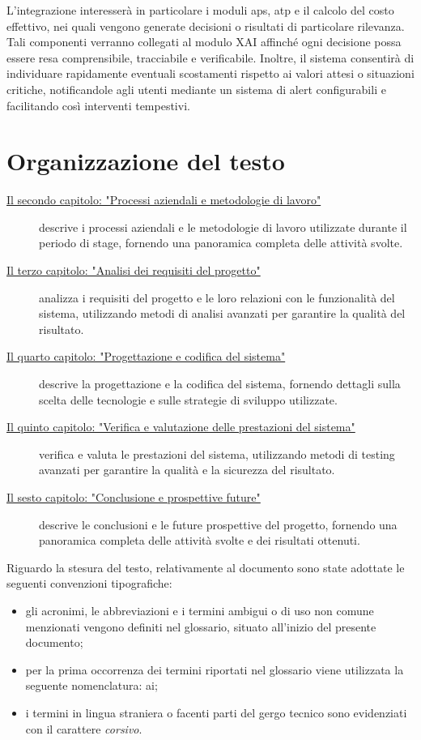 L'integrazione interesserà in particolare i moduli \acrfull{aps}, \acrfull{atp} e il calcolo del 
costo effettivo, nei quali vengono generate decisioni o risultati di particolare 
rilevanza. Tali componenti verranno collegati al modulo XAI affinché ogni decisione possa 
essere resa comprensibile, tracciabile e verificabile. Inoltre, il sistema consentirà di 
individuare rapidamente eventuali scostamenti rispetto ai valori attesi o situazioni 
critiche, notificandole agli utenti mediante un sistema di alert configurabili e facilitando 
così interventi tempestivi.





\section{Organizzazione del testo}

\begin{description}
    \item[\hyperlink{chap:processi-metodologie}{Il secondo capitolo: "Processi aziendali e metodologie di
lavoro"}] descrive i processi aziendali e le metodologie di lavoro utilizzate durante il periodo di stage,
fornendo una panoramica completa delle attività svolte.
    \item[\hyperlink{chap:analisi-requisiti}{Il terzo capitolo: "Analisi dei requisiti del progetto"}] analizza i
requisiti del progetto e le loro relazioni con le funzionalità del sistema, utilizzando metodi di analisi avanzati
per garantire la qualità del risultato.
    \item[\hyperlink{chap:progettazione-codifica}{Il quarto capitolo: "Progettazione e codifica del sistema"}]
descrive la progettazione e la codifica del sistema, fornendo dettagli sulla scelta delle tecnologie e sulle
strategie di sviluppo utilizzate.
    \item[\hyperlink{chap:verifica-validazione}{Il quinto capitolo: "Verifica e valutazione delle prestazioni del
sistema"}] verifica e valuta le prestazioni del sistema, utilizzando metodi di testing avanzati per garantire la
qualità e la sicurezza del risultato.
    \item[\hyperlink{chap:conclusioni}{Il sesto capitolo: "Conclusione e prospettive future"}] descrive le
conclusioni e le future prospettive del progetto, fornendo una panoramica completa delle attività svolte e dei
risultati ottenuti.
\end{description}

Riguardo la stesura del testo, relativamente al documento sono state adottate le seguenti convenzioni tipografiche:
\begin{itemize}
	\item gli acronimi, le abbreviazioni e i termini ambigui o di uso non comune menzionati vengono definiti nel glossario, situato all'inizio del presente documento;
	\item per la prima occorrenza dei termini riportati nel glossario viene utilizzata la seguente nomenclatura: \gls{ai};
	\item i termini in lingua straniera o facenti parti del gergo tecnico sono evidenziati con il carattere \textit{corsivo}.
\end{itemize}

\newpage